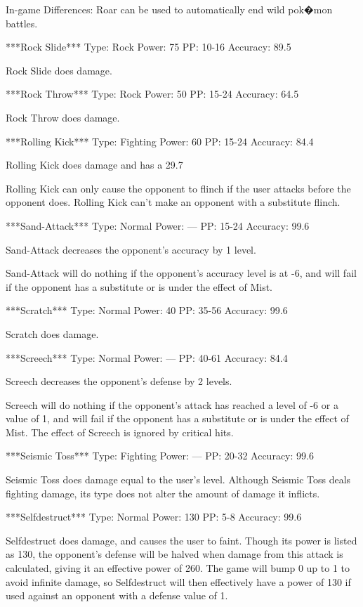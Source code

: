 \documentclass[reprint, aps, prl, paper=A4]{revtex4-1}
\begin{document}
In-game Differences:
Roar can be used to automatically end wild pok�mon battles.


***Rock Slide***
Type: Rock
Power: 75
PP: 10-16
Accuracy: 89.5%

Rock Slide does damage.


***Rock Throw***
Type: Rock
Power: 50
PP: 15-24
Accuracy: 64.5%

Rock Throw does damage.


***Rolling Kick***
Type: Fighting
Power: 60
PP: 15-24
Accuracy: 84.4%

Rolling Kick does damage and has a 29.7%

Rolling Kick can only cause the opponent to flinch if the user attacks before the opponent
does. Rolling Kick can't make an opponent with a substitute flinch.


***Sand-Attack***
Type: Normal
Power: ---
PP: 15-24
Accuracy: 99.6%

Sand-Attack decreases the opponent's accuracy by 1 level.

Sand-Attack will do nothing if the opponent's accuracy level is at -6, and will fail if the
opponent has a substitute or is under the effect of Mist.


***Scratch***
Type: Normal
Power: 40
PP: 35-56
Accuracy: 99.6%

Scratch does damage.


***Screech***
Type: Normal
Power: ---
PP: 40-61
Accuracy: 84.4%

Screech decreases the opponent's defense by 2 levels.

Screech will do nothing if the opponent's attack has reached a level of -6 or a value of 1, and
will fail if the opponent has a substitute or is under the effect of Mist. The effect of
Screech is ignored by critical hits.


***Seismic Toss***
Type: Fighting
Power: ---
PP: 20-32
Accuracy: 99.6%

Seismic Toss does damage equal to the user's level. Although Seismic Toss deals fighting
damage, its type does not alter the amount of damage it inflicts.


***Selfdestruct***
Type: Normal
Power: 130
PP: 5-8
Accuracy: 99.6%

Selfdestruct does damage, and causes the user to faint. Though its power is listed as 130, the
opponent's defense will be halved when damage from this attack is calculated, giving it an
effective power of 260. The game will bump 0 up to 1 to avoid infinite damage, so Selfdestruct
will then effectively have a power of 130 if used against an opponent with a defense value of
1.
\end{document}
